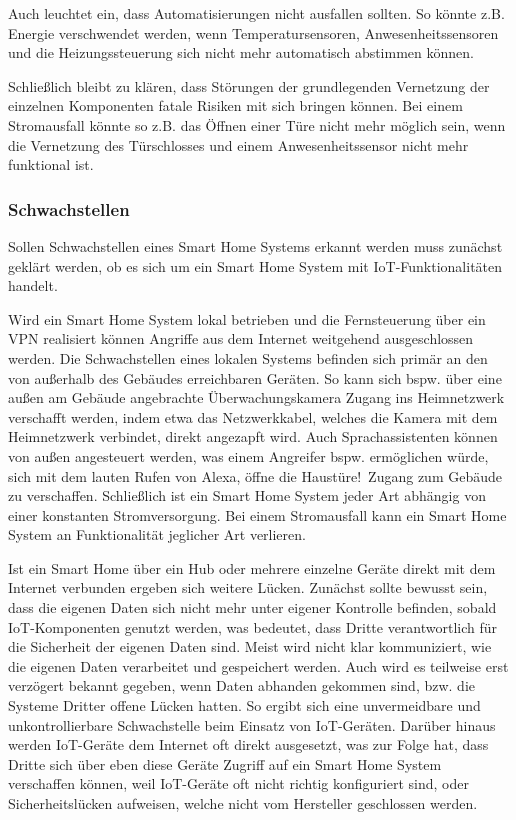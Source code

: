 Auch leuchtet ein, dass Automatisierungen nicht ausfallen sollten.
So könnte z.B. Energie verschwendet werden, wenn Temperatursensoren, Anwesenheitssensoren und die Heizungssteuerung sich nicht mehr automatisch abstimmen können.

Schließlich bleibt zu klären, dass Störungen der grundlegenden Vernetzung der einzelnen Komponenten fatale Risiken mit sich bringen können.
Bei einem Stromausfall könnte so z.B. das Öffnen einer Türe nicht mehr möglich sein, wenn die Vernetzung des Türschlosses und einem Anwesenheitssensor nicht mehr funktional ist.

\subsubsection{Schwachstellen}

Sollen Schwachstellen eines Smart Home Systems erkannt werden muss zunächst geklärt werden, ob es sich um ein Smart Home System mit \ac{IoT}-Funktionalitäten handelt.

Wird ein Smart Home System lokal betrieben und die Fernsteuerung über ein \ac{VPN} realisiert können Angriffe aus dem Internet weitgehend ausgeschlossen werden.
Die Schwachstellen eines lokalen Systems befinden sich primär an den von außerhalb des Gebäudes erreichbaren Geräten.
So kann sich bspw. über eine außen am Gebäude angebrachte Überwachungskamera Zugang ins Heimnetzwerk verschafft werden, indem etwa das Netzwerkkabel, welches die Kamera mit dem Heimnetzwerk verbindet, direkt angezapft wird.
Auch Sprachassistenten können von außen angesteuert werden, was einem Angreifer bspw. ermöglichen würde, sich mit dem lauten Rufen von \glqq Alexa, öffne die Haustüre!\grqq \ Zugang zum Gebäude zu verschaffen.
Schließlich ist ein Smart Home System jeder Art abhängig von einer konstanten Stromversorgung.
Bei einem Stromausfall kann ein Smart Home System an Funktionalität jeglicher Art verlieren.

Ist ein Smart Home über ein Hub oder mehrere einzelne Geräte direkt mit dem Internet verbunden ergeben sich weitere Lücken.
Zunächst sollte bewusst sein, dass die eigenen Daten sich nicht mehr unter eigener Kontrolle befinden, sobald \ac{IoT}-Komponenten genutzt werden, was bedeutet, dass Dritte verantwortlich für die Sicherheit der eigenen Daten sind.
Meist wird nicht klar kommuniziert, wie die eigenen Daten verarbeitet und gespeichert werden.
Auch wird es teilweise erst verzögert bekannt gegeben, wenn Daten abhanden gekommen sind, bzw. die Systeme Dritter offene Lücken hatten.
So ergibt sich eine unvermeidbare und unkontrollierbare Schwachstelle beim Einsatz von \ac{IoT}-Geräten.
Darüber hinaus werden \ac{IoT}-Geräte dem Internet oft direkt ausgesetzt, was zur Folge hat, dass Dritte sich über eben diese Geräte Zugriff auf ein Smart Home System verschaffen können, weil \ac{IoT}-Geräte oft nicht richtig konfiguriert sind, oder Sicherheitslücken aufweisen, welche nicht vom Hersteller geschlossen werden.

